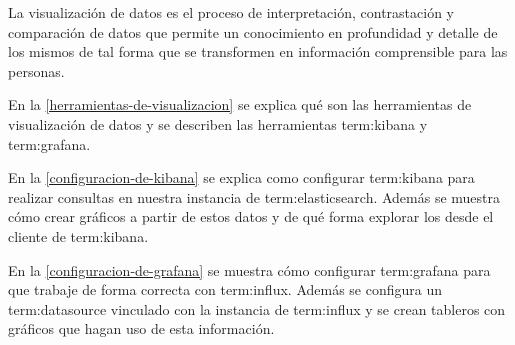 La visualización de datos es el proceso de interpretación, contrastación y
comparación de datos que permite un conocimiento en profundidad y detalle de
los mismos de tal forma que se transformen en información comprensible para
las personas.

En la \autoref{herramientas-de-visualizacion} se explica qué son las
herramientas de visualización de datos y se describen las herramientas
\gls{term:kibana} y \gls{term:grafana}.

En la \autoref{configuracion-de-kibana} se explica como configurar
\gls{term:kibana} para realizar consultas en nuestra instancia de
\gls{term:elasticsearch}. Además se muestra cómo crear gráficos a partir de
estos datos y de qué forma explorar los  desde el cliente 
de \gls{term:kibana}.

En la \autoref{configuracion-de-grafana} se muestra cómo configurar
\gls{term:grafana} para que trabaje de forma correcta con \gls{term:influx}.
Además se configura un \gls{term:datasource} vinculado con la instancia de
\gls{term:influx} y se crean tableros con gráficos que hagan uso de esta
información.
